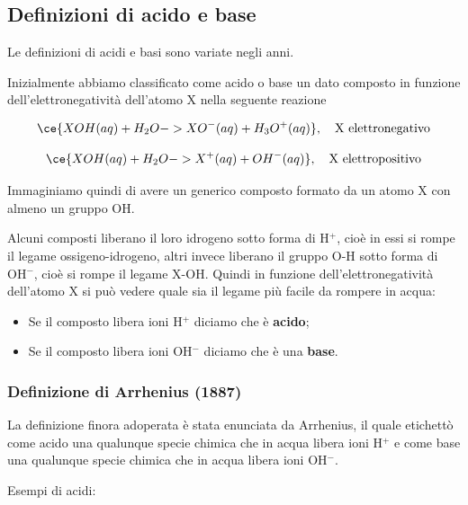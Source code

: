 \normalsize\subsection{Definizioni di acido e base}
Le definizioni di acidi e basi sono variate negli anni.

Inizialmente abbiamo classificato come acido o base un dato composto in funzione dell'elettronegatività dell'atomo X nella seguente reazione

$$\ce{XOH(aq) + H_2O -> XO^-(aq) + H_3O^+(aq)}, \quad \text{X elettronegativo}$$

$$\ce{XOH(aq) + H_2O -> X^+(aq) + OH^-(aq)}, \quad \text{X elettropositivo}$$

Immaginiamo quindi di avere un generico composto formato da un atomo X con almeno un gruppo OH.

Alcuni composti liberano il loro idrogeno sotto forma di H$^+$, cioè in essi si rompe il legame ossigeno-idrogeno, altri invece liberano il gruppo O-H sotto forma di OH$^-$, cioè si rompe il legame X-OH. Quindi in funzione dell'elettronegatività dell'atomo X si può vedere quale sia il legame più facile da rompere in acqua:

\begin{itemize}
    \item Se il composto libera ioni H$^+$ diciamo che è \textbf{acido};
    \item Se il composto libera ioni OH$^-$ diciamo che è una \textbf{base}.
\end{itemize}

\subsubsection{Definizione di Arrhenius (1887)}
La definizione finora adoperata è stata enunciata da Arrhenius, il quale etichettò come acido una qualunque specie chimica che in acqua libera ioni H$^+$ e come base una qualunque specie chimica che in acqua libera ioni OH$^-$.

\vspace{0.2cm}Esempi di acidi:

\vspace{0.2cm}

\vspace{0.2cm}

\vspace{0.2cm}

